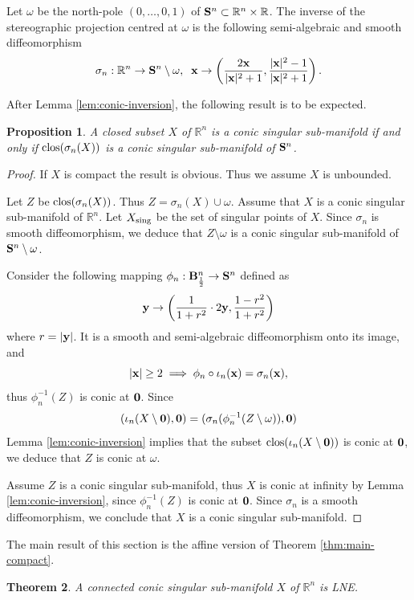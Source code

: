 \documentclass[11pt]{amsart}
\newtheorem{theorem}{Theorem}[section]
\newtheorem{proposition}[theorem]{Proposition}
\newcommand{\field}[1]{\mathbb{#1}}
\newcommand{\R}{\field{R}}
\newcommand{\bbo}{{\bf 0}}
\newcommand{\bB}{{\bf B}}
\newcommand{\bS}{{\bf S}}
\newcommand{\bx}{{\bf x}}
\newcommand{\by}{{\bf y}}
\newcommand{\clos}{{\rm clos}}
\newcommand{\omg}{\omega}
\newcommand{\Rn}{{\R^n}}
\newcommand{\sing}{{\rm sing}}
\newcommand{\sgm}{\sigma}
\numberwithin{equation}{section}
\numberwithin{equation}{section}
\begin{document}
	\smallskip
	Let $\omg$ be the  north-pole $(0,\ldots,0,1)$ of $\bS^n \subset 
	\R^n\times\R$. The inverse of the 
	stereographic projection centred at $\omg$
	is the following semi-algebraic and smooth diffeomorphism 
	$$
	\sgm_n: \Rn\to\bS^n\setminus \omg, \;\;
	\bx \to \left(\frac{2\bx}{|\bx|^2+1},\frac{|\bx|^2-1}{|\bx|^2+1}\right).
	$$
	
	After Lemma \ref{lem:conic-inversion}, the following result is to be 
	expected.
	\begin{proposition}\label{prop:conic-spheric}
		A closed subset $X$ of $\Rn$ is a conic singular sub-manifold if and 
		only if $\clos(\sgm_n(X))$ is a conic singular sub-manifold of $\bS^n$. 
	\end{proposition}
	\begin{proof}
		If $X$ is compact the result is obvious. Thus we assume $X$ is unbounded.
		
		\smallskip
		Let $Z$ be $\clos(\sgm_n(X))$. Thus $Z = \sgm_n(X) \cup \omg$. Assume
		that $X$ is a conic singular sub-manifold of $\Rn$. Let $X_\sing$ be the
		set of singular points of $X$. Since $\sgm_n$ is smooth diffeomorphism, we 
		deduce that $Z\setminus \omg$ is a conic singular sub-manifold of 
		$\bS^n\setminus\omg$.
		
		\smallskip
		Consider the following mapping $\phi_n : \bB_\frac{1}{2}^n \to \bS^n$ defined
		as 
		$$
		\by \to \left(\frac{1}{1+r^2}\cdot 2\by,\frac{1-r^2}{1+r^2}\right)
		$$
		where $r =|\by|$. It is a smooth and semi-algebraic diffeomorphism
		onto its image, and 
		$$
		|\bx| \geq 2 \; \Longrightarrow \; \phi_n\circ\iota_n(\bx) = \sgm_n(\bx),
		$$
		thus $\phi_n^{-1}(Z)$ is conic at $\bbo$. Since 
		$$
		(\iota_n(X\setminus\bbo),\bbo) = (\sgm_n(\phi_n^{-1}(Z\setminus 
		\omg)),\bbo)
		$$
		Lemma \ref{lem:conic-inversion} implies that the subset  
		$\clos(\iota_n(X\setminus\bbo))$ is conic at $\bbo$, we deduce that $Z$ is 
		conic at $\omg$.
		
		\medskip
		Assume $Z$ is a conic singular sub-manifold, thus $X$ is conic at infinity by Lemma \ref{lem:conic-inversion}, since $\phi_n^{-1}(Z)$ is conic
		at $\bbo$. Since $\sgm_n$ is a smooth diffeomorphism, we conclude that 
		$X$ is a conic singular sub-manifold.
	\end{proof}
	The main result of this section is the affine version of Theorem 
	\ref{thm:main-compact}.
	\begin{theorem}\label{thm:main-Rn}
		A connected conic singular sub-manifold $X$ of $\Rn$ is LNE.
	\end{theorem}
\end{document}
